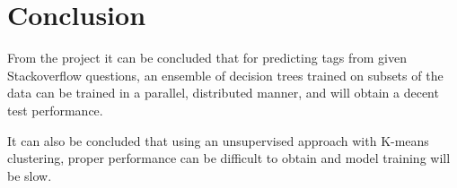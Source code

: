
\section{Conclusion}

From the project it can be concluded that for predicting tags from given
Stackoverflow questions, an ensemble of decision trees trained on subsets of
the data can be trained in a parallel, distributed manner, and will obtain a
decent test performance.

It can also be concluded that using an unsupervised approach with K-means
clustering, proper performance can be difficult to obtain and model training
will be slow.
